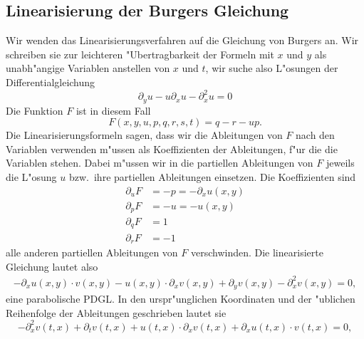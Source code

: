 \subsection{Linearisierung der Burgers Gleichung}
Wir wenden das Linearisierungsverfahren auf die Gleichung von Burgers an.
Wir schreiben sie zur leichteren "Ubertragbarkeit der Formeln
mit $x$ und $y$ als unabh"angige Variablen anstellen von $x$ und $t$,
wir suche also L"osungen der Differentialgleichung
\[
\partial_yu-u\partial_xu-\partial_x^2u=0
\]
Die Funktion $F$ ist in diesem Fall
\[
F(x,y,u,p,q,r,s,t)=q-r-up.
\]
Die Linearisierungsformeln sagen, dass wir die Ableitungen von $F$ nach
den Variablen verwenden m"ussen als Koeffizienten der Ableitungen,
f"ur die die Variablen stehen.  Dabei m"ussen wir in die partiellen Ableitungen
von $F$ jeweils die L"osung $u$ bzw.~ihre partiellen Ableitungen einsetzen.
Die Koeffizienten sind
\begin{align*}
\partial_uF&=-p=-\partial_xu(x,y)
\\
\partial_pF
&=-u=-u(x,y)
\\
\partial_qF
&=1
\\
\partial_rF
&=-1
\end{align*}
alle anderen partiellen Ableitungen von $F$ verschwinden. Die linearisierte
Gleichung lautet also
\begin{align*}
-\partial_xu(x,y)\cdot v(x,y)
-
u(x,y)\cdot\partial_xv(x,y)
+\partial_yv(x,y)
-\partial_x^2v(x,y)=0,
\end{align*}
eine parabolische PDGL. In den urspr"unglichen Koordinaten und der
"ublichen Reihenfolge der Ableitungen geschrieben
lautet sie
\[
-\partial_x^2v(t,x)
+\partial_tv(t,x)
+ u(t,x)\cdot\partial_xv(t,x)
+\partial_xu(t,x)\cdot v(t,x)
=0,
\]

